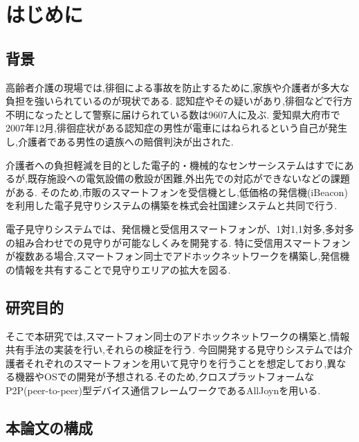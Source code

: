 \chapter{はじめに}
\label{chap:introduction}

\section{背景}
高齢者介護の現場では,徘徊による事故を防止するために,家族や介護者が多大な負担を強いられているのが現状である.
認知症やその疑いがあり,徘徊などで行方不明になったとして警察に届けられている数は9607人に及ぶ.
愛知県大府市で2007年12月,徘徊症状がある認知症の男性が電車にはねられるという自己が発生し,介護者である男性の遺族への賠償判決が出された.

介護者への負担軽減を目的とした電子的・機械的なセンサーシステムはすでにあるが,既存施設への電気設備の敷設が困難,外出先での対応ができないなどの課題がある.
そのため,市販のスマートフォンを受信機とし,低価格の発信機(iBeacon)を利用した電子見守りシステムの構築を株式会社国建システムと共同で行う.

電子見守りシステムでは、発信機と受信用スマートフォンが、1対1,1対多,多対多の組み合わせでの見守りが可能なしくみを開発する.
特に受信用スマートフォンが複数ある場合,スマートフォン同士でアドホックネットワークを構築し,発信機の情報を共有することで見守りエリアの拡大を図る.

\section{研究目的}
そこで本研究では,スマートフォン同士のアドホックネットワークの構築と,情報共有手法の実装を行い,それらの検証を行う.
今回開発する見守りシステムでは介護者それぞれのスマートフォンを用いて見守りを行うことを想定しており,異なる機器やOSでの開発が予想される.そのため,クロスプラットフォームなP2P(peer-to-peer)型デバイス通信フレームワークであるAllJoynを用いる.

\section{本論文の構成}

